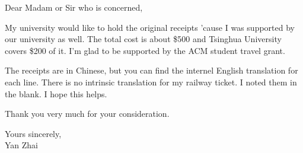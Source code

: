 \documentclass[10pt]{letter}
\begin{document}
\begin{letter}{\textleaf\textleaf\textleaf}
        \pagestyle{plain}
        \date{July 27, 2011}

        \opening{Dear Madam or Sir who is concerned,}

        \par
        My university would like to hold the original receipts 'cause I was
        supported by our university as well. The total cost is about \$500 and
        Tsinghua University covers \$200 of it. I'm glad to be supported by
        the ACM student travel grant.

        \par
        The receipts are in Chinese, but you can find the internel English translation
        for each line. There is no intrinsic translation for my railway
        ticket. I noted them in the blank. I hope this helps.

        \par
        Thank you very much for your consideration.

        \closing{Yours sincerely,\\ Yan Zhai}

    \end{letter}
\end{document}
